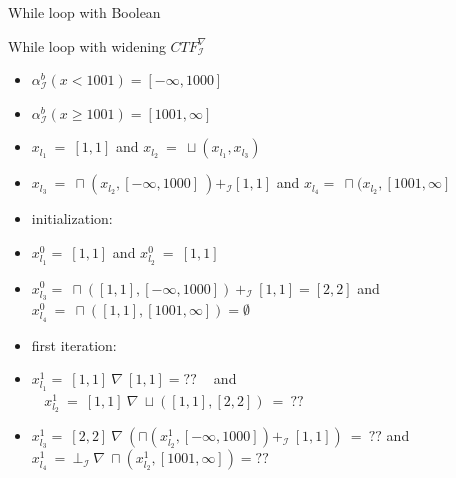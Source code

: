 \begin{frame}{While loop with Boolean}
\begin{exampleblock}{While loop with widening $CTF_\mathcal{I}^\nabla$}
	\centering 
	\begin{itemize}
		\item $\alpha_{\scriptscriptstyle \mathcal{I}}^{\scriptscriptstyle b} ( x < 1001) = [-\infty,1000]$
		\item $\alpha_{\scriptscriptstyle \mathcal{I}}^{\scriptscriptstyle b} ( x \geq 1001) = [1001,\infty]$
		\item $x_{l_1}~=~ [1,1]$ and  $x_{l_2}~=~ \sqcup(x_{l_1},x_{l_3})$
		\item $x_{l_3}~=~ \sqcap(x_{l_2},[-\infty,1000]~) +_\mathcal{I} [1,1]$ and  $x_{l_4} =~\sqcap(x_{l_2},[1001,\infty] $
		\item initialization:
		\item $x_{l_1}^0=~ [1,1]$  and $x_{l_2}^0~=~ [1,1]$\\
		\item $x_{l_3}^0=~ \sqcap([1,1],[-\infty,1000]) ~+_\mathcal{I}~ [1,1] = [2,2]$  and $x_{l_4}^0~=~ \sqcap([1,1],[1001,\infty]) =\emptyset $\\
	    \item first iteration:
	    \item $x_{l_1}^1=~ [1,1]~\nabla~[1,1]= ??~~~~$  and $~~~~x_{l_2}^1~=~ [1,1]~\nabla~\sqcup([1,1],[2,2])~=~??$\\
	    \item $x_{l_3}^1=~ [2,2]~\nabla~(\sqcap(x_{l_2}^1,[-\infty,1000]) +_\mathcal{I} ~[1,1]) ~= ~??$  and $x_{l_4}^1~=~ \bot_\mathcal{I}~\nabla~\sqcap(x_{l_2}^1,[1001,\infty]) = ?? $\\	
	\end{itemize}
\end{exampleblock}
\end{frame}

